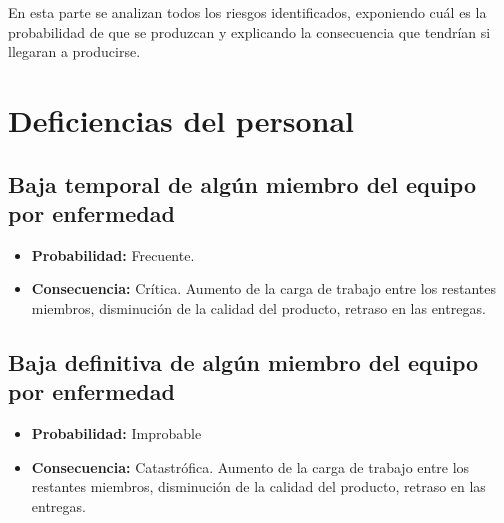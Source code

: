 \documentclass[spanish,a4paper,11pt, twoside]{report}	%
\begin{document}
En esta parte se analizan todos los riesgos identificados, exponiendo cuál es la probabilidad de que se produzcan y 
explicando la consecuencia que tendrían si llegaran a producirse.

\section{Deficiencias del personal}
%

	\subsection*{Baja temporal de algún miembro del equipo por enfermedad}
		\begin{itemize}
			\item \textbf {Probabilidad: }Frecuente.
			\item \textbf {Consecuencia: }Crítica. Aumento de la carga de trabajo entre los
				restantes miembros, disminución de la calidad del producto, retraso en las
				entregas.
		\end{itemize}
	
\subsection*{Baja definitiva de algún miembro del equipo por enfermedad}
		\begin{itemize}
			\item \textbf {Probabilidad: }Improbable
			\item \textbf {Consecuencia: }Catastrófica. Aumento de la carga de trabajo entre
							los restantes miembros, disminución de la calidad del producto, retraso en las
							entregas.
		\end{itemize}
	
\end{document}
